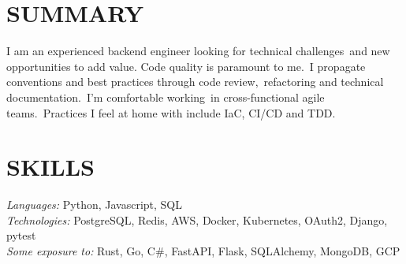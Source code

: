 \documentclass[line,margin]{res}
\begin{document}
\address{\href{mailto://simon.r.crowe@protonmail.com}{simon.r.crowe@protonmail.com}}


\begin{resume}

\section{SUMMARY} I am an experienced backend engineer looking for technical challenges\
                  and new opportunities to add value. Code quality is paramount to me.\
                  I propagate conventions and best practices through code review,\
                  refactoring and technical documentation.\
                  I’m comfortable working\ in cross-functional agile teams.\
                  Practices I feel at home with include IaC, CI/CD and TDD.

\section{SKILLS} {\sl Languages:} Python, Javascript, SQL \\
                {\sl Technologies:} PostgreSQL, Redis, AWS, Docker, Kubernetes, OAuth2, Django, pytest \\
                {\sl Some exposure to:} Rust, Go, C\#, FastAPI, Flask, SQLAlchemy, MongoDB, GCP



\end{resume}
\end{document}
